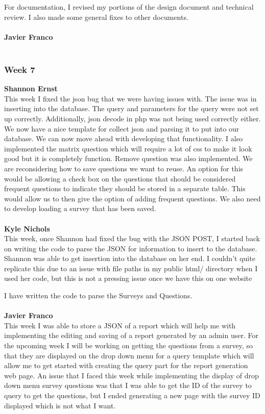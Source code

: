\documentclass[../final.tex]{subfiles}
\begin{document}
For documentation, I revised my portions of the design document and technical review. I also made some general fixes to other documents. \\ \\
\textbf{Javier Franco}\\ \\
\subsubsection{Week 7}
\textbf{Shannon Ernst}\\
This week I fixed the json bug that we were having issues with. The issue was in inserting into the database. The query and parameters for the query were not set up correctly. Additionally, json decode in php was not being used correctly either. We now have a nice template for collect json and parsing it to put into our database. We can now move ahead with developing that functionality. I also implemented the matrix question which will require a lot of css to make it look good but it is completely function. Remove question was also implemented. We are reconsidering how to save questions we want to reuse. An option for this would be allowing a check box on the questions that should be considered frequent questions to indicate they should be stored in a separate table. This would allow us to then give the option of adding frequent questions. We also need to develop loading a survey that has been saved. \\ \\
\textbf{Kyle Nichols}\\
This week, once Shannon had fixed the bug with the JSON POST, I started back on writing the code to parse the JSON for information to insert to the database. Shannon was able to get insertion into the database on her end. I couldn't quite replicate this due to an issue with file paths in my public html/ directory when I used her code, but this is not a pressing issue once we have this on one website

I have written the code to parse the Surveys and Questions. \\ \\
\textbf{Javier Franco}\\ 
This week I was able to store a JSON of a report which will help me with implementing the editing and saving of a report generated by an admin user. For the upcoming week I will be working on getting the questions from a survey, so that they are displayed on the drop down menu for a query template which will allow me to get started with creating the query part for the report generation web page. An issue that I faced this week while implementing the display of drop down menu survey questions was that I was able to get the ID of the survey to query to get the questions, but I ended generating a new page with the survey ID displayed which is not what I want.\\
\end{document}
